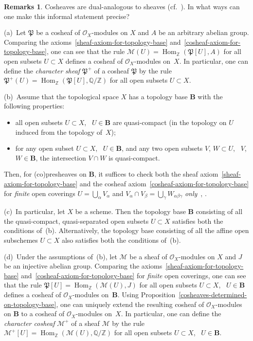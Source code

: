 \documentclass[12pt,a4paper]{amsart}
\newcommand{\+}{\nobreakdash-}
\renewcommand{\:}{\colon}
\DeclareMathOperator{\Hom}{Hom}
\newcommand{\bB}{\mathbf B}
\newcommand{\cO}{\mathcal O}
\newcommand{\cM}{\mathcal M}
\newcommand{\fP}{\mathfrak P}
\newcommand{\boQ}{\mathbb Q}
\newcommand{\boZ}{\mathbb Z}
\theoremstyle{plain}
\theoremstyle{definition}
\newtheorem{rems}[thm]{Remarks}
\begin{document}
\begin{rems} \label{finite-coverings-suffice-remarks}
 Cosheaves are dual-analogous to sheaves (cf.~\cite[Preface]{Pcosh}).
 In what ways can one make this informal statement precise?

\smallskip
 (a)~Let $\fP$ be a cosheaf of $\cO_X$\+modules on $X$ and $A$
be an arbitrary abelian group.
 Comparing the axioms~\eqref{sheaf-axiom-for-topology-base}
and~\eqref{cosheaf-axiom-for-topology-base}, one can see that the rule
$\cM(U)=\Hom_\boZ(\fP[U],A)$ for all open subsets $U\subset X$
defines a cosheaf of $\cO_X$\+modules on~$X$.
 In particular, one can define the \emph{character sheaf} $\fP^+$ of
a cosheaf $\fP$ by the rule $\fP^+(U)=\Hom_\boZ(\fP[U],\boQ/\boZ)$
for all open subsets $U\subset X$.

\smallskip
 (b)~Assume that the topological space $X$ has a topology base $\bB$
with the following properties:
\begin{itemize}
\item all open subsets $U\subset X$, \ $U\in\bB$ are quasi-compact
(in the topology on $U$ induced from the topology of~$X$);
\item for any open subset $U\subset X$, \ $U\in\bB$, and any two open
subsets $V$, $W\subset U$, \ $V$, $W\in\bB$, the intersection $V\cap W$
is quasi-compact.
\end{itemize}
 Then, for (co)presheaves on $\bB$, it suffices to check both the sheaf
axiom~\eqref{sheaf-axiom-for-topology-base} and the cosheaf
axiom~\eqref{cosheaf-axiom-for-topology-base} for \emph{finite} open
coverings $U=\bigcup_\alpha V_\alpha$ and $V_\alpha\cap V_\beta=
\bigcup_\gamma W_{\alpha\beta\gamma}$
\emph{only}~\cite[Remark~2.1.4]{Pcosh}, \cite[Remarks~3.2.1]{Pform}.

\smallskip
 (c)~In particular, let $X$ be a scheme.
 Then the topology base $\bB$ consisting of all the quasi-compact,
quasi-separated open subsets $U\subset X$ satisfies both the conditions
of~(b).
 Alternatively, the topology base consisting of all the affine open
subschemes $U\subset X$ also satisfies both the conditions of~(b).

\smallskip
 (d)~Under the assumptions of~(b), let $\cM$ be a sheaf of
$\cO_X$\+modules on $X$ and $J$ be an injective abelian group.
 Comparing the axioms~\eqref{sheaf-axiom-for-topology-base}
and~\eqref{cosheaf-axiom-for-topology-base} for \emph{finite} open
coverings, one can see that the rule $\fP[U]=\Hom_\boZ(\cM(U),J)$ for
all open subsets $U\subset X$, \ $U\in\bB$ defines a cosheaf of
$\cO_X$\+modules on~$\bB$.
 Using Proposition~\ref{cosheaves-determined-on-topology-base}, one
can uniquely extend the resulting cosheaf of $\cO_X$\+modules on $\bB$
to a cosheaf of $\cO_X$\+modules on~$X$.
 In particular, one can define the \emph{character cosheaf} $\cM^+$ of
a sheaf $\cM$ by the rule $\cM^+[U]=\Hom_\boZ(\cM(U),\boQ/\boZ)$
for all open subsets $U\subset X$, \ $U\in\bB$.


\end{rems}
\end{document}
